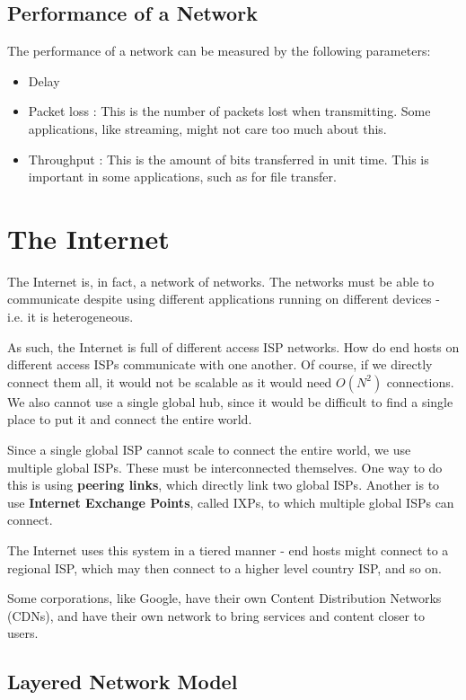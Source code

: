 \documentclass[12pt,letterpaper]{article}
\theoremstyle{definition}
\begin{document}
\subsection{Performance of a Network}

The performance of a network can be measured by the following parameters:

\begin{itemize}
  \item Delay
  \item Packet loss : This is the number of packets lost when transmitting. Some applications, like streaming, might not care too much about this.
  \item Throughput : This is the amount of bits transferred in unit time. This is important in some applications, such as for file transfer. 
\end{itemize}

\section{The Internet}

The Internet is, in fact, a network of networks. The networks must be able to communicate despite using different applications running on different devices - i.e. it is heterogeneous.

As such, the Internet is full of different access ISP networks. How do end hosts on different access ISPs communicate with one another. Of course, if we directly connect them all, it would not be scalable as it would need $O(N^2)$ connections. We also cannot use a single global hub, since it would be difficult to find a single place to put it and connect the entire world.

Since a single global ISP cannot scale to connect the entire world, we use multiple global ISPs. These must be interconnected themselves. One way to do this is using \textbf{peering links}, which directly link two global ISPs. Another is to use \textbf{Internet Exchange Points}, called IXPs, to which multiple global ISPs can connect.

The Internet uses this system in a tiered manner - end hosts might connect to a regional ISP, which may then connect to a higher level country ISP, and so on.

Some corporations, like Google, have their own Content Distribution Networks (CDNs), and have their own network to bring services and content closer to users.

\subsection{Layered Network Model}
\end{document}
